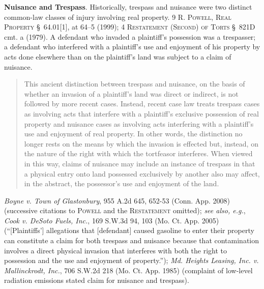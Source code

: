 \item \textbf{Nuisance and Trespass}.
Historically, trespass and nuisance were two distinct common-law classes of
injury involving real property. 9 \textsc{R. Powell, Real Property} \S~64.01[1],
at 64--5 (1999); 4 \textsc{Restatement (Second) of Torts} \S~821D cmt. a (1979).
A defendant who invaded a plaintiff's possession was a trespasser; a defendant
who interfered with a plaintiff's use and enjoyment of his property by acts done
elsewhere than on the plaintiff's land was subject to a claim of nuisance. 
\begin{quote}
This ancient distinction between trespass and nuisance, on the basis of whether
an invasion of a plaintiff's land was direct or indirect, is not followed by
more recent cases. Instead, recent case law treats trespass cases as involving
acts that interfere with a plaintiff's exclusive possession of real property and
nuisance cases as involving acts interfering with a plaintiff's use and
enjoyment of real property. In other words, the distinction no longer rests on
the means by which the invasion is effected but, instead, on the nature of the
right with which the tortfeasor interferes. When viewed in this way, claims of
nuisance may include an instance of trespass in that a physical entry onto land
possessed exclusively by another also may affect, in the abstract, the
possessor's use and enjoyment of the land.
\end{quote}
\emph{Boyne v. Town of Glastonbury}, 955 A.2d 645, 652-53 (Conn. App. 2008)
(successive citations to \textsc{Powell} and the \textsc{Restatement} omitted);
\textit{see also, e.g.}, \emph{Cook v. DeSoto Fuels, Inc.}, 169 S.W.3d 94, 103
(Mo. Ct. App. 2005) (``[Plaintiffs'] allegations that [defendant] caused
gasoline to enter their property can constitute a claim for both trespass and
nuisance because that contamination involves a direct physical invasion that
interferes with both the right to possession and the use and enjoyment of
property.''); \emph{Md. Heights Leasing, Inc. v. Mallinckrodt, Inc.}, 706
S.W.2d 218 (Mo. Ct. App. 1985) (complaint of low-level radiation emissions
stated claim for nuisance and trespass).


